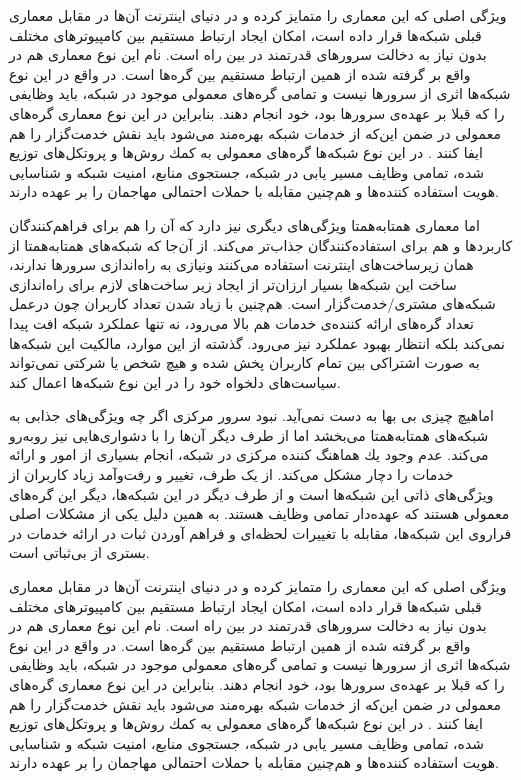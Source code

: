 \documentclass[12pt,twoside]{xepersian-magazine}
\begin{document}
\begin{article}{1}
ويژگی اصلی که اين معماری را متمايز کرده و در دنيای اينترنت آن‌ها در مقابل معماری قبلی شبكه‌ها قرار داده است، امكان ايجاد ارتباط مستقيم  بين كامپيوترهای مختلف بدون نياز به دخالت سرورهای قدرتمند در بين راه است.  نام‌ اين نوع معماری هم در واقع بر گرفته شده از همین  ارتباط مستقیم بين گره‌ها است.  در واقع در اين نوع شبكه‌ها اثری از سرورها نيست و تمامی گره‌های معمولی موجود در شبكه، بايد وظايفی را که قبلا بر عهده‌ی سرورها بود، خود انجام دهند. بنابراين در اين نوع معماری گره‌های معمولی در ضمن اين‌که از خدمات شبکه بهره‌مند می‌شود بايد نقش خدمت‌گزار را هم ايفا کنند . در اين نوع شبکه‌ها گره‌های معمولی به كمك روش‌ها و پروتكل‌های توزيع شده، تمامی وظايف  مسير يابی در شبكه، جستجوی منابع، امنيت شبكه و شناسايی هويت استفاده كننده‌ها و هم‌چنين مقابله با حملات احتمالی مهاجمان را بر عهده دارند.

اما معماری همتابه‌همتا ويژگی‌های ديگری نيز دارد که آن را هم برای فراهم‌کنندگان کاربردها و هم برای استفاده‌کنندگان جذاب‌تر می‌کند.  از آن‌جا که شبکه‌های همتابه‌همتا از همان زيرساخت‌های اينترنت استفاده می‌کنند ونيازی به راه‌اندازی سرورها ندارند، ساخت اين شبكه‌ها بسيار ارزان‌تر از ايجاد زير ساخت‌های لازم برای راه‌اندازی شبكه‌های مشتری/خدمت‌گزار است.  هم‌چنين با زياد شدن تعداد کاربران چون درعمل تعداد گره‌های ارائه کننده‌ی خدمات هم بالا می‌رود، نه تنها عملكرد شبكه افت پيدا نمی‌كند بلكه انتظار بهبود عملکرد نيز می‌رود. گذشته از اين موارد، مالكيت اين شبكه‌ها به صورت اشتراكی بين تمام کاربران پخش شده و هيچ شخص يا شركتی نمی‌تواند سياست‌های دلخواه خود را در اين نوع شبكه‌ها اعمال کند.

اماهيچ چيزی بی‌ بها به دست نمی‌آید. نبود سرور مرکزی اگر چه  ويژگی‌های جذابی به شبکه‌های همتابه‌همتا می‌بخشد اما از طرف ديگر آن‌ها را با دشواری‌هايی نيز روبه‌رو می‌کند.  عدم وجود يك هماهنگ كننده مركزی در شبكه، انجام بسياری از امور و ارائه خدمات را  دچار مشكل می‌کند.  از يک طرف، تغيير و رفت‌وآمد زیاد کاربران از ويژگی‌های ذاتی اين شبکه‌ها است و از طرف ديگر در اين شبكه‌ها، ديگر اين گره‌های معمولی  هستند كه  عهده‌دار تمامی وظايف هستند. به همين دلیل يکی از مشکلات اصلی فراروی اين شبكه‌ها، مقابله با  تغييرات لحظه‌ای و فراهم آوردن ثبات در ارائه  خدمات در بستری از بی‌ثباتی است.  


ويژگی اصلی که اين معماری را متمايز کرده و در دنيای اينترنت آن‌ها در مقابل معماری قبلی شبكه‌ها قرار داده است، امكان ايجاد ارتباط مستقيم  بين كامپيوترهای مختلف بدون نياز به دخالت سرورهای قدرتمند در بين راه است.  نام‌ اين نوع معماری هم در واقع بر گرفته شده از همین  ارتباط مستقیم بين گره‌ها است.  در واقع در اين نوع شبكه‌ها اثری از سرورها نيست و تمامی گره‌های معمولی موجود در شبكه، بايد وظايفی را که قبلا بر عهده‌ی سرورها بود، خود انجام دهند. بنابراين در اين نوع معماری گره‌های معمولی در ضمن اين‌که از خدمات شبکه بهره‌مند می‌شود بايد نقش خدمت‌گزار را هم ايفا کنند . در اين نوع شبکه‌ها گره‌های معمولی به كمك روش‌ها و پروتكل‌های توزيع شده، تمامی وظايف  مسير يابی در شبكه، جستجوی منابع، امنيت شبكه و شناسايی هويت استفاده كننده‌ها و هم‌چنين مقابله با حملات احتمالی مهاجمان را بر عهده دارند.


\end{article}
\end{document}

